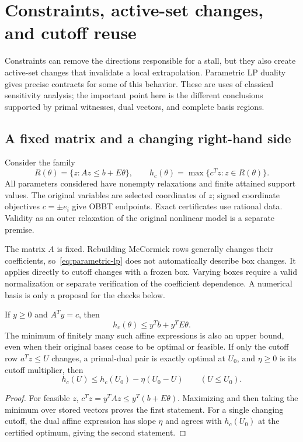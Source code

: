 \section{Constraints, active-set changes, and cutoff reuse}\label{sec:constraints}

Constraints can remove the directions responsible for a stall, but they
also create active-set changes that invalidate a local extrapolation.
Parametric LP duality gives precise contracts for some of this behavior.
These are uses of classical sensitivity analysis; the important point
here is the different conclusions supported by primal witnesses, dual
vectors, and complete basis regions.

\subsection{A fixed matrix and a changing right-hand side}

Consider the family
\begin{equation}\label{eq:parametric-lp}
 R(\theta)=\{z:Az\le b+E\theta\},\qquad
 h_c(\theta)=\max\{c^Tz:z\in R(\theta)\}.
\end{equation}
All parameters considered have nonempty relaxations and finite attained
support values. The original variables are selected coordinates of $z$;
signed coordinate objectives $c=\pm e_i$ give OBBT endpoints. Exact
certificates use rational data. Validity as an outer relaxation of the
original nonlinear model is a separate premise.

The matrix $A$ is fixed. Rebuilding McCormick rows generally changes their
coefficients, so~\eqref{eq:parametric-lp} does not automatically describe
box changes. It applies directly to cutoff changes with a frozen box.
Varying boxes require a valid normalization or separate verification of
the coefficient dependence. A numerical basis is only a proposal for
the checks below.

\begin{proposition}\label{prop:dual}
If $y\ge0$ and $A^Ty=c$, then
\begin{equation}\label{eq:dual-envelope}
 h_c(\theta)\le y^Tb+y^TE\theta.
\end{equation}
The minimum of finitely many such affine expressions is also an upper
bound, even when their original bases cease to be optimal or feasible.
If only the cutoff row $a^Tz\le U$ changes, a primal-dual pair is
exactly optimal at $U_0$, and $\eta\ge0$ is its cutoff multiplier, then
\begin{equation}\label{eq:cutoff-dual}
 h_c(U)\le h_c(U_0)-\eta(U_0-U)\qquad(U\le U_0).
\end{equation}
\end{proposition}
\begin{proof}
For feasible $z$, $c^Tz=y^TAz\le y^T(b+E\theta)$. Maximizing and
then taking the minimum over stored vectors proves the first statement.
For a single changing cutoff, the dual affine expression has slope
$\eta$ and agrees with $h_c(U_0)$ at the certified optimum, giving the
second statement.
\end{proof}

